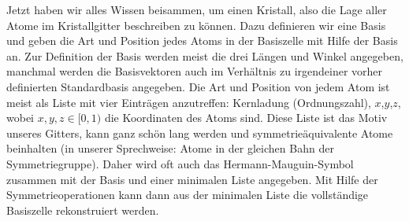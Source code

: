 
Jetzt haben wir alles Wissen beisammen, um einen Kristall, also die Lage aller Atome im Kristallgitter beschreiben zu können. Dazu definieren wir eine Basis und geben die Art und Position jedes Atoms in der Basiszelle mit Hilfe der Basis an. Zur Definition der Basis werden meist die drei Längen und Winkel angegeben, manchmal werden die Basisvektoren auch im Verhältnis zu irgendeiner vorher definierten Standardbasis angegeben. Die Art und Position von jedem Atom ist meist als Liste mit vier Einträgen anzutreffen: Kernladung (Ordnungszahl), $x$,$y$,$z$, wobei $x,y,z \in [0,1)$ die Koordinaten des Atoms sind. Diese Liste ist das Motiv unseres Gitters, kann ganz schön lang werden und symmetrieäquivalente Atome beinhalten (in unserer Sprechweise: Atome in der gleichen Bahn der Symmetriegruppe). Daher wird oft auch das Hermann-Mauguin-Symbol zusammen mit der Basis und einer minimalen Liste angegeben. Mit Hilfe der Symmetrieoperationen kann dann aus der minimalen Liste die vollständige Basiszelle rekonstruiert werden.